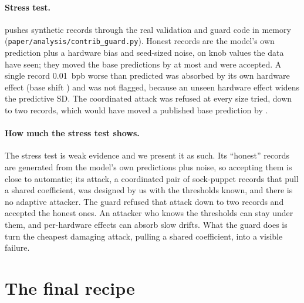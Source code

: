 \paragraph{Stress test.}  pushes synthetic records through the real validation and guard code in
memory (\texttt{paper/analysis/contrib\_guard.py}). Honest records are the model's own prediction plus a hardware
bias and seed-sized noise, on knob values the data have seen; they moved the base predictions by at most
 and were accepted. A single record 0.01~bpb worse than predicted was absorbed by its own
hardware effect (base shift ) and was not flagged, because an unseen hardware effect widens
the predictive SD. The coordinated attack was refused at every size tried, down to two records, which would have moved a
published base prediction by .

\begin{table}[!htbp]
  \centering
  \caption{\textbf{Refit-guard stress test.} Changes in $10^{-3}$ bpb: built-in in-sample MAE, pair-validation MAE
    (leave one pair out), and the largest move of a published base recipe's prediction. ``Flagged'': records with
    $|z|>\val{guard-outlier-z}$. The guard refuses a refit when either MAE worsens by more than
     or a base prediction moves by more than .}
  \label{tab:guard}
  
\end{table}

\paragraph{How much the stress test shows.} The stress test is weak evidence and we present it as such. Its
``honest'' records are generated from the model's own predictions plus noise, so accepting them is close to
automatic; its attack, a coordinated pair of sock-puppet records that pull a shared coefficient, was designed by us
with the thresholds known, and there is no adaptive attacker. The guard refused that attack down to two records and
accepted the honest ones. An attacker who knows the thresholds can stay under them, and per-hardware effects can
absorb slow drifts. What the guard does is turn the cheapest damaging attack, pulling a shared coefficient, into a
visible failure.

\clearpage
\section{The final recipe}
\label{app:recipe}

